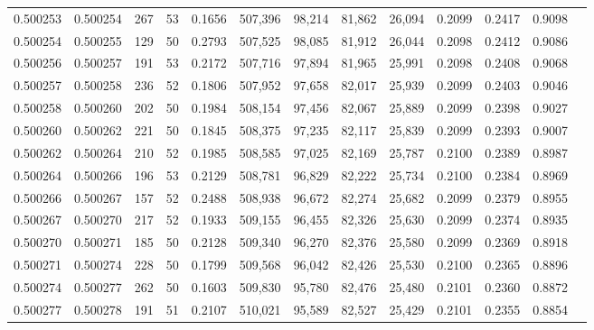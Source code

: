 \begin{tabular}{rrrrrrrrrrrrr}
0.500253 & 0.500254 & 267 &  53 &                                     0.1656 & 507,396 &  98,214 &  81,862 &  26,094 & 0.2099 & 0.2417 & 0.9098 \\
0.500254 & 0.500255 & 129 &  50 &                                     0.2793 & 507,525 &  98,085 &  81,912 &  26,044 & 0.2098 & 0.2412 & 0.9086 \\
0.500256 & 0.500257 & 191 &  53 &                                     0.2172 & 507,716 &  97,894 &  81,965 &  25,991 & 0.2098 & 0.2408 & 0.9068 \\
0.500257 & 0.500258 & 236 &  52 &                                     0.1806 & 507,952 &  97,658 &  82,017 &  25,939 & 0.2099 & 0.2403 & 0.9046 \\
0.500258 & 0.500260 & 202 &  50 &                                     0.1984 & 508,154 &  97,456 &  82,067 &  25,889 & 0.2099 & 0.2398 & 0.9027 \\
0.500260 & 0.500262 & 221 &  50 &                                     0.1845 & 508,375 &  97,235 &  82,117 &  25,839 & 0.2099 & 0.2393 & 0.9007 \\
0.500262 & 0.500264 & 210 &  52 &                                     0.1985 & 508,585 &  97,025 &  82,169 &  25,787 & 0.2100 & 0.2389 & 0.8987 \\
0.500264 & 0.500266 & 196 &  53 &                                     0.2129 & 508,781 &  96,829 &  82,222 &  25,734 & 0.2100 & 0.2384 & 0.8969 \\
0.500266 & 0.500267 & 157 &  52 &                                     0.2488 & 508,938 &  96,672 &  82,274 &  25,682 & 0.2099 & 0.2379 & 0.8955 \\
0.500267 & 0.500270 & 217 &  52 &                                     0.1933 & 509,155 &  96,455 &  82,326 &  25,630 & 0.2099 & 0.2374 & 0.8935 \\
0.500270 & 0.500271 & 185 &  50 &                                     0.2128 & 509,340 &  96,270 &  82,376 &  25,580 & 0.2099 & 0.2369 & 0.8918 \\
0.500271 & 0.500274 & 228 &  50 &                                     0.1799 & 509,568 &  96,042 &  82,426 &  25,530 & 0.2100 & 0.2365 & 0.8896 \\
0.500274 & 0.500277 & 262 &  50 &                                     0.1603 & 509,830 &  95,780 &  82,476 &  25,480 & 0.2101 & 0.2360 & 0.8872 \\
0.500277 & 0.500278 & 191 &  51 &                                     0.2107 & 510,021 &  95,589 &  82,527 &  25,429 & 0.2101 & 0.2355 & 0.8854 \\

\end{tabular}
